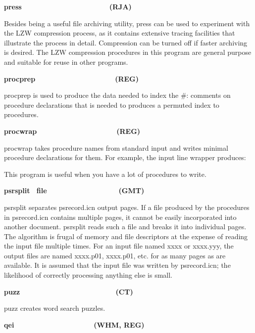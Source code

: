 {\sffamily\bfseries
press\ \ \ \ \ \ \ \ \ \ \ \ \ \ \ \ \ \ \ \ \ \ (RJA)}

Besides being a useful file archiving utility, \textsf{press} can be
used to experiment with the LZW compression process, as it contains
extensive tracing facilities that illustrate the process
in detail. Compression can be turned off if faster archiving is
desired. The LZW compression procedures in this program are general
purpose and suitable for reuse in other programs.

{\sffamily\bfseries
procprep\ \ \ \ \ \ \ \ \ \ \ \ \ \ \ \ \ \ \ \ (REG)}

\textsf{procprep} is used to produce the data needed to index the
{\textquotedbl}\#:{\textquotedbl} comments on procedure declarations
that is needed to produces a permuted index to procedures. 

{\sffamily\bfseries
procwrap\ \ \ \ \ \ \ \ \ \ \ \ \ \ \ \ \ \ \ \ (REG)}

\textsf{procwrap} takes procedure names from standard input and writes
minimal procedure declarations for them. For example, the input line
wrapper produces:



This program is useful when you have a lot of procedures to write. 

{\sffamily\bfseries
psrsplit
\ \textrm{\textmd{file\ \ \ \ \ \ \ \ \ \ \ \ \ \ \ \ \ \ }}(GMT)}

\textsf{psrsplit} separates \textsf{psrecord.icn}
output pages. If a file produced by the procedures in
\textsf{psrecord.icn} contains multiple pages, it cannot be easily
incorporated into another document. \textsf{psrsplit} reads such a file
and breaks it into individual pages. The algorithm is frugal of memory
and file descriptors at the expense of reading the input file multiple
times. For an input file named \textsf{xxxx} or \textsf{xxxx.yyy}, the
output files are named \textsf{xxxx.p01}, \textsf{xxxx.p01}, etc. for
as many pages as are available. It is assumed that the input file was
written by \textsf{psrecord.icn}; the likelihood of correctly
processing anything else is small. 

{\sffamily\bfseries
puzz\ \ \ \ \ \ \ \ \ \ \ \ \ \ \ \ \ \ \ \ \ \  \ \ (CT)}

\textsf{puzz} creates word search puzzles. 

{\sffamily\bfseries
qei\ \ \ \ \ \ \ \ \ \ \ \ \ \ \ \ \ \ \ \ (WHM, REG)}

